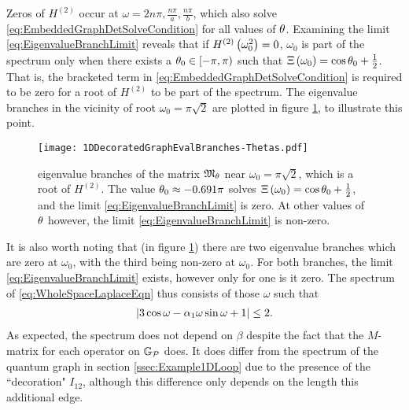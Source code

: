 Zeros of $H^{(2)}$ occur at $\omega= 2n\pi, \frac{n\pi}{a}, \frac{n\pi}{b}$, which also solve \eqref{eq:EmbeddedGraphDetSolveCondition} for all values of $\theta$.
Examining the limit \eqref{eq:EigenvalueBranchLimit} reveals that if $H^{(2)}\left( \omega_0^2 \right)=0$, $\omega_0$ is part of the spectrum only when there exists a $\theta_0\in\left[-\pi,\pi\right)$ such that $\Xi\left( \omega_0 \right)=\cos\theta_0+\frac{1}{2}$.
That is, the bracketed term in \eqref{eq:EmbeddedGraphDetSolveCondition} is required to be zero for a root of $H^{(2)}$ to be part of the spectrum.
The eigenvalue branches in the vicinity of root $\omega_0=\pi\sqrt{2}$ are plotted in figure \ref{fig:1DDecoratedGraphEvalBranches-Thetas}, to illustrate this point.
\begin{figure}[t!]
	\centering
	\texttt{[image: 1DDecoratedGraphEvalBranches-Thetas.pdf]}
	\caption{\label{fig:1DDecoratedGraphEvalBranches-Thetas} eigenvalue branches of the matrix $\mathfrak{M}_{\theta}$ near $\omega_0 = \pi\sqrt{2}$, which is a root of $H^{(2)}$. The value $\theta_0\approx-0.691\pi$ solves $\Xi\left( \omega_0 \right)=\cos\theta_0+\frac{1}{2}$, and the limit \eqref{eq:EigenvalueBranchLimit} is zero. At other values of $\theta$ however, the limit \eqref{eq:EigenvalueBranchLimit} is non-zero.}
\end{figure}
It is also worth noting that (in figure \ref{fig:1DDecoratedGraphEvalBranches-Thetas}) there are two eigenvalue branches which are zero at $\omega_0$, with the third being non-zero at $\omega_0$.
For both branches, the limit \eqref{eq:EigenvalueBranchLimit} exists, however only for one is it zero.
The spectrum of \eqref{eq:WholeSpaceLaplaceEqn} thus consists of those $\omega$ such that
\begin{align*}
	\left\lvert  3\cos\omega - \alpha_1\omega\sin\omega + 1  \right\rvert \leq 2.
\end{align*}
As expected, the spectrum does not depend on $\beta$ despite the fact that the $M$-matrix for each operator on $\mathbb{G}_{\mathcal{P}}$ does.
It does differ from the spectrum of the quantum graph in section \ref{ssec:Example1DLoop} due to the presence of the ``decoration" $I_{12}$, although this difference only depends on the length this additional edge.


